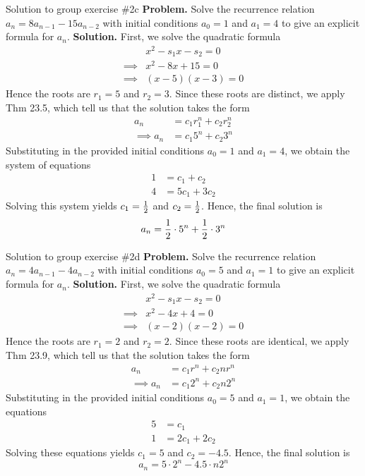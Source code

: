 \documentclass[10pt]{beamer}
\begin{document}
\begin{frame}{Solution to group exercise \#2c}
\footnotesize
\textbf{Problem.} Solve the recurrence relation $a_n = 8 a_{n-1} - 15a_{n-2}$  with initial conditions $a_0=1$ and $a_1=4$ to give an explicit formula for $a_n$. 
\vfill  \vfill 
\textbf{Solution.} First, we solve the quadratic formula 
%
\begin{align*}
& x^2 - s_1 x - s_2 =0  \\
\implies & x^2 - 8 x + 15 =0  \\
\implies & (x-5)(x-3) =0  
\end{align*}
%
Hence the roots are $r_1=5$ and $r_2=3$.  Since these roots are distinct, we apply Thm 23.5, which tell us that the solution takes the form 
%
\begin{align*}
a_n &= c_1 r_1^n + c_2 r_2^n \\
\implies a_n &= c_1 5^n + c_2 3^n 
\end{align*}
%
Substituting in the provided initial conditions  $a_0=1$ and $a_1=4$, we obtain the system of equations
%
\begin{align*}
1 &= c_1 + c_2 \\
4 &= 5c_1 + 3c_2
\end{align*}
%
Solving this system yields $c_1 = \frac{1}{2}$ and $c_2 = \frac{1}{2}$.  Hence, the final solution is
\[ a_n = \frac{1}{2} \cdot  5^n + \frac{1}{2} \cdot 3^n  \]


\end{frame}

\begin{frame}{Solution to group exercise \#2d}
\footnotesize
\textbf{Problem.} Solve the recurrence relation $a_n = 4 a_{n-1} -4 a_{n-2}$  with initial conditions $a_0=5$ and $a_1=1$ to give an explicit formula for $a_n$. 
\vfill  \vfill 
\textbf{Solution.} First, we solve the quadratic formula 
%
\begin{align*}
& x^2 - s_1 x - s_2 =0  \\
\implies & x^2 - 4 x + 4 =0  \\
\implies & (x-2)(x-2) =0  
\end{align*}
%
Hence the roots are $r_1=2$ and $r_2=2$.  Since these roots are identical, we apply Thm 23.9, which tell us that the solution takes the form 
%
\begin{align*}
a_n &= c_1 r^n + c_2 n r^n \\
\implies a_n &= c_1 2^n + c_2 n 2^n 
\end{align*}
%
Substituting in the provided initial conditions  $a_0=5$ and $a_1=1$, we obtain the equations
%
\begin{align*}
5 &= c_1  \\
1 &= 2c_1 + 2c_2
\end{align*}
%
Solving these equations yields $c_1 = 5$ and $c_2 = -4.5$.  Hence, the final solution is
\[ a_n = 5 \cdot  2^n -4.5 \cdot n 2^n  \]


\end{frame}
\end{document}
